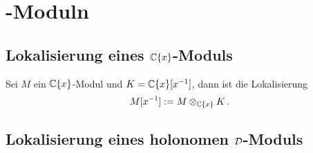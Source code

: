 
\section{\cD-Moduln}

\subsection{Lokalisierung eines $\mathbb{C}\{x\}$-Moduls}

\begin{defn}
  Sei $M$ ein $\mathbb{C}\{x\}$-Modul und $K=\mathbb{C}\{x\}[x^{-1}]$, dann ist die
  Lokalisierung
  \[ M[x^{-1}]:=M\otimes_{\mathbb{C}\{x\}}K \,. \]
\end{defn}

\subsection{Lokalisierung eines holonomen $\mathcal{D}$-Moduls}

